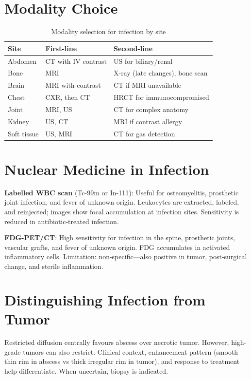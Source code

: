 \section{Modality Choice}

\begin{table}[h]
\centering
\caption{Modality selection for infection by site}
\begin{tabular}{|l|l|l|}
\hline
\textbf{Site} & \textbf{First-line} & \textbf{Second-line} \\
\hline
Abdomen & CT with IV contrast & US for biliary/renal \\
Bone & MRI & X-ray (late changes), bone scan \\
Brain & MRI with contrast & CT if MRI unavailable \\
Chest & CXR, then CT & HRCT for immunocompromised \\
Joint & MRI, US & CT for complex anatomy \\
Kidney & US, CT & MRI if contrast allergy \\
Soft tissue & US, MRI & CT for gas detection \\
\hline
\end{tabular}
\end{table}

\section{Nuclear Medicine in Infection}

\textbf{Labelled WBC scan} (Tc-99m or In-111): Useful for osteomyelitis, prosthetic joint infection, and fever of unknown origin. Leukocytes are extracted, labeled, and reinjected; images show focal accumulation at infection sites. Sensitivity is reduced in antibiotic-treated infection.

\textbf{FDG-PET/CT}: High sensitivity for infection in the spine, prosthetic joints, vascular grafts, and fever of unknown origin. FDG accumulates in activated inflammatory cells. Limitation: non-specific---also positive in tumor, post-surgical change, and sterile inflammation.

\section{Distinguishing Infection from Tumor}

\begin{pearlbox}
Restricted diffusion centrally favours abscess over necrotic tumor. However, high-grade tumors can also restrict. Clinical context, enhancement pattern (smooth thin rim in abscess vs thick irregular rim in tumor), and response to treatment help differentiate. When uncertain, biopsy is indicated.
\end{pearlbox}

